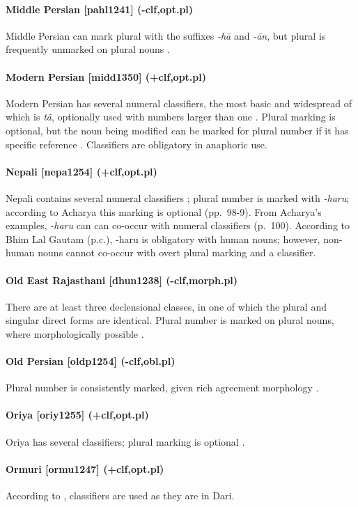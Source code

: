 \paragraph{Middle Persian [pahl1241] (-clf,opt.pl)}
Middle Persian can mark plural with the suffixes {\it -h\=a} and {\it -\=an}, but plural is frequently unmarked on plural nouns \citep[223]{Skjaervo2009}.
\paragraph{Modern Persian [midd1350] (+clf,opt.pl)}
Modern Persian has several numeral classifiers, the most basic and widespread of which is {\it t\=a}, optionally used with numbers larger than one \citep[478]{WindfuhrPerry2009}. Plural marking is optional, but the noun being modified can be marked for plural number if it has specific reference \citep[195]{Mahootian1997}. Classifiers are obligatory in anaphoric use.
\paragraph{Nepali [nepa1254] (+clf,opt.pl)}
Nepali contains several numeral classifiers \citep[100]{Acharya1991}; plural number is marked with {\it -haru}; according to Acharya this marking is optional (pp.\ 98-9). From Acharya's examples, {\it -haru} can can co-occur with numeral classifiers (p.\ 100). According to Bhim Lal Gautam (p.c.), -haru is obligatory with human nouns; however, non-human nouns cannot co-occur with overt plural marking and a classifier.
\paragraph{Old East Rajasthani [dhun1238] (-clf,morph.pl)}
There are at least three declensional classes, in one of which the plural and singular direct forms are identical. Plural number is marked on plural nouns, where morphologically possible \citep{Metzger2003}.
\paragraph{Old Persian [oldp1254] (-clf,obl.pl)}
Plural number is consistently marked, given rich agreement morphology \citep{Kent1953}.
\paragraph{Oriya [oriy1255] (+clf,opt.pl)}
Oriya has several classifiers; plural marking is optional \citep{NeukomPatnaik2003}.
\paragraph{Ormuri [ormu1247] (+clf,opt.pl)}
According to \citet[133]{Kieffer2003}, classifiers are used as they are in Dari.
